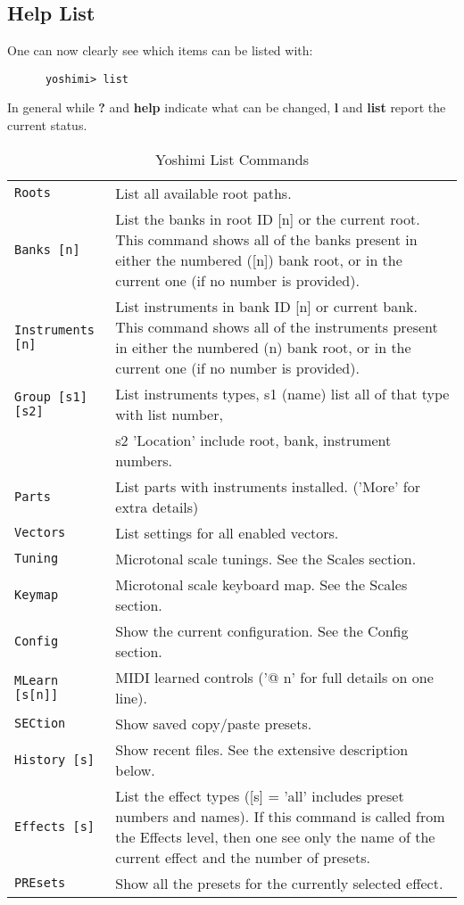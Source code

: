\subsection{Help List}
\label{subsec:command_line_help_list}

   One can now clearly see which items can be listed with:

   \begin{verbatim}
      yoshimi> list
   \end{verbatim}

   In general while \textbf{?} and \textbf{help} indicate what can be
   changed, \textbf{l} and \textbf{list} report the current status.

\begin{center}
\begin{longtable}{p{4cm} p{10cm}}
\caption[Yoshimi List Commands]{Yoshimi List Commands} \\

\texttt{Roots} &
   List all available root paths. \\
\texttt{Banks [n]} &
   List the banks in root ID [n] or the current root.
   This command shows all of the banks present in either the numbered ([n])
   bank root, or in the current one (if no number is provided).  \\
\texttt{Instruments [n]} &
   List instruments in bank ID [n] or current bank.
   This command shows all of the instruments present in either the numbered
   (n) bank root, or in the current one (if no number is provided).  \\
\texttt{Group [s1] [s2]} &
   List instruments types, s1 (name) list all of that type with list number,
   \\
\texttt{ } &
   s2 'Location' include root, bank, instrument numbers. \\
\texttt{Parts} &
   List parts with instruments installed. ('More' for extra details)\\
\texttt{Vectors} &
   List settings for all enabled vectors. \\
\texttt{Tuning} &
   Microtonal scale tunings. See the Scales section. \\
\texttt{Keymap} &
   Microtonal scale keyboard map.  See the Scales section. \\
\texttt{Config} &
   Show the current configuration. See the Config section. \\
\texttt{MLearn [s[n]]} &
   MIDI learned controls ('@ n' for full details on one line). \\
\texttt{SECtion} &
   Show saved copy/paste presets. \\
\texttt{History [s]} &
   Show recent files. See the extensive description below. \\
\texttt{Effects [s]} &
   List the effect types ([s] = 'all' includes preset numbers and names).
   If this command is called from the Effects level, then one see only the
   name of the current effect and the number of presets. \\
\texttt{PREsets} &
   Show all the presets for the currently selected effect. \\

\end{longtable}
\end{center}

